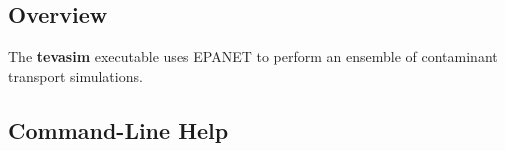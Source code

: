 \subsection{Overview}\label{tevasimExecutable_tevasimOverview}

The {\bfseries tevasim} executable uses EPANET to perform an ensemble of contaminant transport simulations.

\subsection{Command-\/Line Help}\label{tevasimExecutable_tevasimUsage}



 
